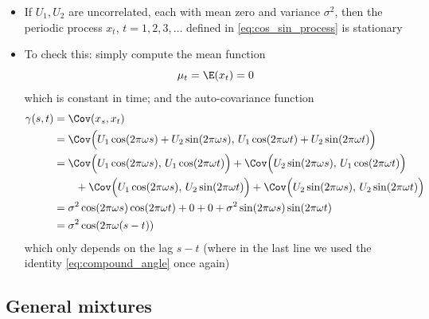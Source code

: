 \documentclass{article}
\begin{document}
\begin{itemize}
\item If $U_1,U_2$ are uncorrelated, each with mean zero and variance
  $\sigma^2$, then the periodic process $x_t$, $t = 1,2,3,\dots$ defined in
  \eqref{eq:cos_sin_process} is stationary 

\item To check this: simply compute the mean function
  \[
  \mu_t = \E(x_t) = 0
  \]
  which is constant in time; and the auto-covariance function 
  \begin{align*}
  \gamma(s,t) &= \Cov(x_s, x_t) \\
  &= \Cov\Big( U_1 \cos(2\pi\omega s) + U_2 \sin(2\pi\omega s), \, 
    U_1 \cos(2\pi\omega t) + U_2 \sin(2\pi\omega t) \Big) \\
  &= \Cov\Big( U_1 \cos(2\pi\omega s), \, U_1 \cos(2\pi\omega t) \Big) +
    \Cov\Big( U_2 \sin(2\pi\omega s), \, U_1 \cos(2\pi\omega t) \Big) \\
  &\qquad + \Cov\Big( U_1 \cos(2\pi\omega s), \, U_2 \sin(2\pi\omega t) \Big) +  
     \Cov\Big( U_2 \sin(2\pi\omega s), \, U_2 \sin(2\pi\omega t) \Big) \\
  &=\sigma^2 \cos(2\pi\omega s) \cos(2\pi\omega t) + 0 + 0 + \sigma^2
    \sin(2\pi\omega s) \sin(2\pi\omega t) \\
  &= \sigma^2 \cos(2\pi\omega (s-t))
  \end{align*}
  which only depends on the lag $s-t$ (where in the last line we used the
  identity \eqref{eq:compound_angle} once again)
\end{itemize}

\subsection{General mixtures}
\end{document}
